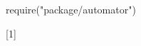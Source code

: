 \usepackage{luacode}


\begin{luacode}
require("package/automator")
\end{luacode}

\let\originalinput

\renewcommand{}[1]{%
}
